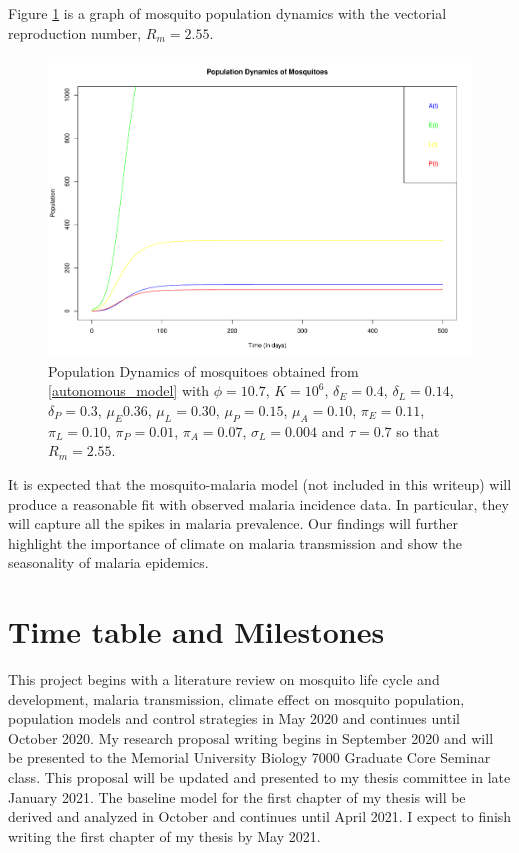 \documentclass[12pt,a4paper,titlepage]{article}
\begin{document}
Figure \ref{population_dynamics} is a graph of mosquito population dynamics with the vectorial reproduction number, $R_m = 2.55$.
\newpage
\begin{figure}[!h]
	\includegraphics[width=0.8 \textwidth]{mosquito.pdf}
	\caption{Population Dynamics of mosquitoes obtained from \eqref{autonomous_model} with $\phi = 10.7$, $K = 10^6$, $\delta_E = 0.4$, $\delta_L = 0.14$, $\delta_P = 0.3$, $\mu_E 0.36$, $\mu_L = 0.30$, $\mu_P = 0.15$, $\mu_A = 0.10$,   $\pi_E = 0.11$, $\pi_L = 0.10$, $\pi_P =  0.01$, $\pi_A = 0.07$, $\sigma_L = 0.004$ and $\tau = 0.7$ so that $R_m = 2.55.$}
	\label{population_dynamics} 
\end{figure}


It is expected that the mosquito-malaria model (not included in this writeup) will produce a reasonable fit with observed malaria incidence data. In particular, they will capture all the spikes in malaria prevalence. Our findings will further highlight the importance of climate on malaria transmission and show the seasonality of malaria epidemics. 



\section{Time table and Milestones}
This project begins with a literature review on mosquito life cycle and development, malaria transmission, climate effect on mosquito population, population models and control strategies in May 2020 and continues until October 2020. My research proposal writing begins in September 2020 and will be presented to the Memorial University Biology 7000 Graduate Core Seminar class. This proposal will be updated and presented to my thesis committee in  late January 2021. The baseline model for the first chapter of my thesis will be derived and analyzed in October and continues until April 2021. I expect to finish writing the first chapter of my thesis by May 2021. 






\end{document}
